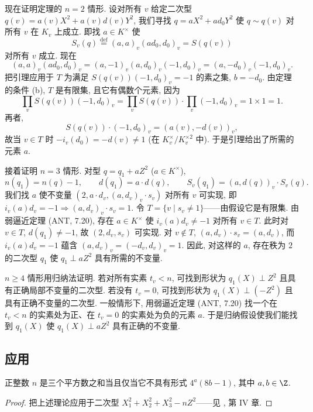 现在证明定理的 $n=2$ 情形. 设对所有 $v$ 给定二次型 $q(v)=a(v)X^{2}+a(v)d(v)Y^{2}$, 我们寻找 $q=aX^{2}+ad_{0}Y^{2}$ 使 $q\sim q(v)$ 对所有 $v$ 在 $K_v$ 上成立. 即找 $a\in K^{\times}$ 使
\[
S_{v}(q)\overset{\text{def}}{=}(a,a)_{v}(ad_{0},d_{0})_{v}=S(q(v))
\]
对所有 $v$ 成立. 现在
\[
(a,a)_{v}(ad_{0},d_{0})_{v}=(a,-1)_{v}(a,d_{0})_{v}(-1,d_{0})_{v}=(a,-d_{0})_{v}(-1,d_{0})_{v}.
\]
把引理应用于 $T$ 为满足 $S(q(v))(-1,d_{0})_{v}=-1$ 的素之集, $b=-d_0$. 由定理的条件 (b), $T$ 是有限集, 且它有偶数个元素, 因为
\[
\prod_{v}S(q(v))(-1,d_{0})_{v}=\prod_{v}S(q(v))\cdot\prod_{v}(-1,d_{0})_{v}=1\times 1=1.
\]
再者,
\[
S(q(v))\cdot(-1,d_{0})_{v}=(a(v),-d(v))_{v},
\]
故当 $v\in T$ 时 $-i_v(d_0)=-d(v)\ne 1$ (在 $K_v^{\times}/K_v^{\times 2}$ 中). 于是引理给出了所需的元素 $a$.

接着证明 $n=3$ 情形. 对型 $q=q_1+aZ^{2}$ ($a\in K^{\times}$),
\[
n(q_{1})=n(q)-1,\qquad d(q_{1})=a\cdot d(q),\qquad S_{v}(q_{1})=(a,d(q))_{v}\cdot S_{v}(q).
\]
我们找 $a$ 使不变量 $(2,a\cdot d_v,(a,d_v)_v\cdot s_v)$ 对所有 $v$ 可实现, 即 $i_v(a)d_v=-1\Rightarrow (a,d_v)_v\cdot s_v=1$. 令 $T=\{v\mid s_v\ne 1\}$——由假设它是有限集. 由弱逼近定理 (ANT, 7.20), 存在 $a\in K^{\times}$ 使 $i_v(a)d_v\ne -1$ 对所有 $v\in T$. 此时对 $v\in T$, $d(q_1)\ne -1$, 故 $(2,d_v,s_v)$ 可实现. 对 $v\notin T$, $(a,d_v)\cdot s_v=(a,d_v)$, 而 $i_v(a)d_v=-1$ 蕴含 $(a,d_v)_v=(-d_v,d_v)_v=1$. 因此, 对这样的 $a$, 存在秩为 $2$ 的二次型 $q_1$ 使 $q_1\perp aZ^{2}$ 具有所需的不变量.

$n\ge 4$ 情形用归纳法证明. 若对所有实素 $t_v<n$, 可找到形状为 $q_1(X)\perp Z^{2}$ 且具有正确局部不变量的二次型. 若没有 $t_v=0$, 可找到形状为 $q_1(X)\perp(-Z^{2})$ 且具有正确不变量的二次型. 一般情形下, 用弱逼近定理 (ANT, 7.20) 找一个在 $t_v<n$ 的实素处为正、在 $t_v=0$ 的实素处为负的元素 $a$. 于是归纳假设使我们能找到 $q_1(X)$ 使 $q_1(X)\perp aZ^{2}$ 具有正确的不变量.

\subsection*{应用}

\begin{proposition}[GAUSS]\label{prop:viii.6.14}
正整数 $n$ 是三个平方数之和当且仅当它不具有形式 $4^{a}(8b-1)$, 其中 $a,b\in\Z$.
\end{proposition}

\begin{proof}
把上述理论应用于二次型 $X_1^{2}+X_2^{2}+X_3^{2}-nZ^{2}$——见 \cite{Serre1970}, 第 IV 章.
\end{proof}

